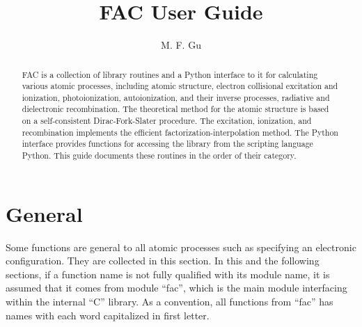 \documentclass[12pt]{article}
\begin{document}
\title{FAC User Guide}
\author{M. F. Gu}
\maketitle

\begin{abstract}
FAC is a collection of library routines and a Python interface to it for
calculating various atomic processes, including atomic structure, electron
collisional excitation and ionization, photoionization, autoionization, and
their inverse 
processes, radiative and dielectronic recombination. The theoretical method
for the atomic structure is based on a self-consistent Dirac-Fork-Slater
procedure. The excitation, ionization, and recombination implements the
efficient factorization-interpolation method. The Python interface provides
functions for accessing the library from the scripting language Python. This
guide documents these routines in the order of their category.
\end{abstract}

\section{General}
Some functions are general to all atomic processes such as specifying an
electronic configuration. They are collected in this section. In this and the
following sections, if a function name is not fully qualified with its module
name, it is assumed that it comes from module ``fac'', which is the main module
interfacing within the internal ``C'' library. As a convention, all functions
from ``fac'' has names with each word capitalized in first letter.
\end{document}
